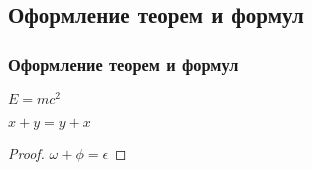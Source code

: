 \subsection{Оформление теорем и формул}


\begin{frame} [label=frame_from]
	\frametitle{Оформление теорем и формул}
	
	\begin{thm}
		$E = mc^2$
	\end{thm}
    \centerline{
    \hyperlink{frame_proof}{}
    }
	\begin{thm}
		$x + y = y + x$
	\end{thm}
	
	\begin{proof}
		$\omega + \phi = \epsilon$
	\end{proof}
\end{frame}
